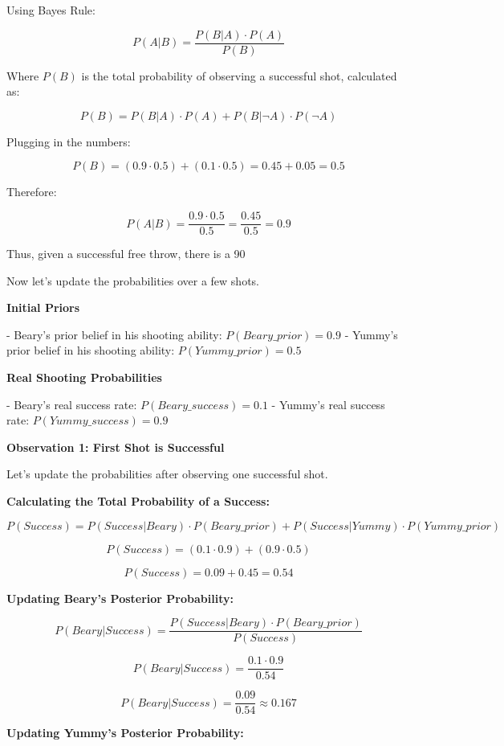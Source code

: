\documentclass[12pt]{book} %
\begin{document}
Using Bayes Rule:

\[ P(A|B) = \frac{P(B|A) \cdot P(A)}{P(B)} \]

Where \( P(B) \) is the total probability of observing a successful shot, calculated as:

\[ P(B) = P(B|A) \cdot P(A) + P(B|\neg A) \cdot P(\neg A) \]

Plugging in the numbers:

\[ P(B) = (0.9 \cdot 0.5) + (0.1 \cdot 0.5) = 0.45 + 0.05 = 0.5 \]

Therefore:

\[ P(A|B) = \frac{0.9 \cdot 0.5}{0.5} = \frac{0.45}{0.5} = 0.9 \]

Thus, given a successful free throw, there is a 90%

Now let's update the probabilities over a few shots.

\textbf{Initial Priors}

- Beary's prior belief in his shooting ability: \( P(Beary\_prior) = 0.9 \)
- Yummy's prior belief in his shooting ability: \( P(Yummy\_prior) = 0.5 \)

\textbf{Real Shooting Probabilities}

- Beary's real success rate: \( P(Beary\_success) = 0.1 \)
- Yummy's real success rate: \( P(Yummy\_success) = 0.9 \)

\textbf{Observation 1: First Shot is Successful}

Let's update the probabilities after observing one successful shot.

\textbf{Calculating the Total Probability of a Success:}

\[ P(Success) = P(Success|Beary) \cdot P(Beary\_prior) + P(Success|Yummy) \cdot P(Yummy\_prior) \]

\[ P(Success) = (0.1 \cdot 0.9) + (0.9 \cdot 0.5) \]

\[ P(Success) = 0.09 + 0.45 = 0.54 \]

\textbf{Updating Beary's Posterior Probability:}

\[ P(Beary|Success) = \frac{P(Success|Beary) \cdot P(Beary\_prior)}{P(Success)} \]

\[ P(Beary|Success) = \frac{0.1 \cdot 0.9}{0.54} \]

\[ P(Beary|Success) = \frac{0.09}{0.54} \approx 0.167 \]

\textbf{Updating Yummy's Posterior Probability:}
\end{document}
